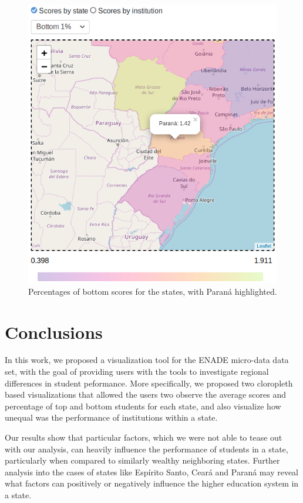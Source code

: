 \documentclass{vgtc}                          %
\begin{document}
\begin{figure}
	\centering
	\includegraphics[width=\columnwidth]{figures/pr.png}
	\caption{Percentages of bottom scores for the states, with Paraná highlighted.}
	\label{fig:pr}
\end{figure}

\section{Conclusions}

In this work, we proposed a visualization tool for the ENADE micro-data data set, with the goal of providing users with the tools to investigate regional differences in student peformance. More specifically, we proposed two cloropleth based visualizations that allowed the users two observe the average scores and percentage of top and bottom students for each state, and also visualize how unequal was the performance of institutions within a state.

Our results show that particular factors, which we were not able to tease out with our analysis, can heavily influence the performance of students in a state, particularly when compared to similarly wealthy neighboring states. Further analysis into the cases of states like Espírito Santo, Ceará and Paraná may reveal what factors can positively or negatively influence the higher education system in a state.
\end{document}
